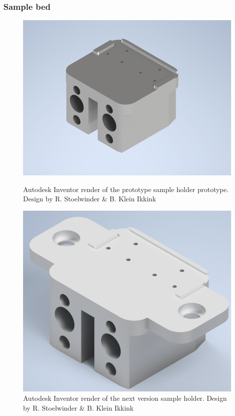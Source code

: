 \documentclass[10pt]{article}
\begin{document}
\subsubsection{Sample bed}

\begin{figure}[H]
  \centering
  \begin{minipage}[b]{0.45\textwidth}
    \includegraphics[width=1.17\textwidth]{img/sample_holder_and_mask/prototype_sample_block.png}
    \caption{Autodesk Inventor render of the prototype sample holder prototype. Design by R. Stoelwinder \& B. Klein Ikkink}
    \label{fig:prototype_sample_holder}
  \end{minipage}
  \hfill
  \begin{minipage}[b]{0.45\textwidth}
    \includegraphics[width=1\textwidth]{img/sample_holder_and_mask/sample_holder_render_bas.png}
    \caption{Autodesk Inventor render of the next version sample holder. Design by R. Stoelwinder \& B. Klein Ikkink}
    \label{fig:next_sample_holder}
  \end{minipage}
\end{figure}
\end{document}

